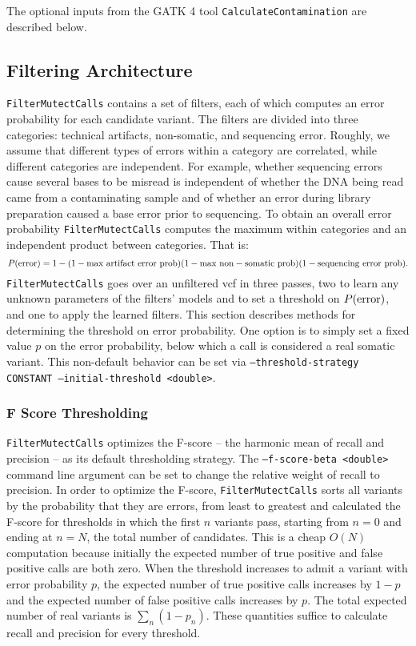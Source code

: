 \documentclass[nofootinbib,amssymb,amsmath]{revtex4}
\newcommand{\code}[1]{\texttt{#1}}
\begin{document}
The optional inputs from the GATK 4 tool \code{CalculateContamination} are described below.

\subsection{Filtering Architecture}
\code{FilterMutectCalls} contains a set of filters, each of which computes an error probability for each candidate variant.  The filters are divided into three categories: technical artifacts, non-somatic, and sequencing error.  Roughly, we assume that different types of errors within a category are correlated, while different categories are independent.  For example, whether sequencing errors cause several bases to be misread is independent of whether the DNA being read came from a contaminating sample and of whether an error during library preparation caused a base error prior to sequencing.  To obtain an overall error probability \code{FilterMutectCalls} computes the maximum within categories and an independent product between categories.  That is:
\begin{equation}
P({\rm error}) = 1 - (1 - {\rm max~artifact~error~prob})(1 - {\rm max~non-somatic~prob})(1 - {\rm sequencing~error~prob}).
\end{equation}
\code{FilterMutectCalls} goes over an unfiltered vcf in three passes, two to learn any unknown parameters of the filters' models and to set a threshold on $P({\rm error})$, and one to apply the learned filters.  This section describes methods for determining the threshold on error probability.  One option is to simply set a fixed value $p$ on the error probability, below which a call is considered a real somatic variant.  This non-default behavior can be set via \code{--threshold-strategy CONSTANT --initial-threshold <double>}.

\subsubsection{F Score Thresholding}
\code{FilterMutectCalls} optimizes the F-score -- the harmonic mean of recall and precision -- as its default thresholding strategy.  The \code{--f-score-beta <double>} command line argument can be set to change the relative weight of recall to precision.  In order to optimize the F-score, \code{FilterMutectCalls} sorts all variants by the probability that they are errors, from least to greatest and calculated the F-score for thresholds in which the first $n$ variants pass, starting from $n = 0$ and ending at $n = N$, the total number of candidates.  This is a cheap $O(N)$ computation because initially the expected number of true positive and false positive calls are both zero.  When the threshold increases to admit a variant with error probability $p$, the expected number of true positive calls increases by $1 - p$ and the expected number of false positive calls increases by $p$.  The total expected number of real variants is $\sum_n (1 - p_n)$.  These quantities suffice to calculate recall and precision for every threshold.
\end{document}
